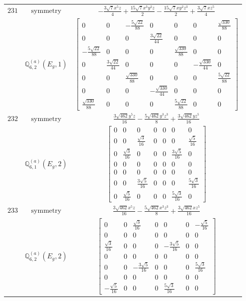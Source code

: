 \documentclass[fleqn,8pt,landscape]{jsarticle}
\begin{document}
\begin{longtable}{ccc}
$ 231 $ & $ \text{symmetry} $ & $ - \frac{3 \sqrt{7} x^{5} z}{4} + \frac{15 \sqrt{7} x^{3} y^{2} z}{2} - \frac{15 \sqrt{7} x y^{2} z^{3}}{2} + \frac{3 \sqrt{7} x z^{5}}{4} $ \\
$  $ & $ \mathbb{Q}_{6,2}^{(a)}(E_{g},1) $ & $ \begin{bmatrix} 0 & 0 & - \frac{5 \sqrt{22}}{88} & 0 & 0 & 0 & \frac{\sqrt{330}}{88} \\ 0 & 0 & 0 & \frac{3 \sqrt{22}}{44} & 0 & 0 & 0 \\ - \frac{5 \sqrt{22}}{88} & 0 & 0 & 0 & \frac{\sqrt{330}}{88} & 0 & 0 \\ 0 & \frac{3 \sqrt{22}}{44} & 0 & 0 & 0 & - \frac{\sqrt{330}}{44} & 0 \\ 0 & 0 & \frac{\sqrt{330}}{88} & 0 & 0 & 0 & \frac{5 \sqrt{22}}{88} \\ 0 & 0 & 0 & - \frac{\sqrt{330}}{44} & 0 & 0 & 0 \\ \frac{\sqrt{330}}{88} & 0 & 0 & 0 & \frac{5 \sqrt{22}}{88} & 0 & 0 \end{bmatrix} $ \\ \hline
$ 232 $ & $ \text{symmetry} $ & $ \frac{3 \sqrt{462} y^{5} z}{16} - \frac{5 \sqrt{462} y^{3} z^{3}}{8} + \frac{3 \sqrt{462} y z^{5}}{16} $ \\
$  $ & $ \mathbb{Q}_{6,1}^{(a)}(E_{g},2) $ & $ \begin{bmatrix} 0 & 0 & 0 & 0 & 0 & 0 & 0 \\ 0 & 0 & \frac{\sqrt{3}}{16} & 0 & 0 & 0 & \frac{\sqrt{5}}{16} \\ 0 & \frac{\sqrt{3}}{16} & 0 & 0 & 0 & \frac{3 \sqrt{5}}{16} & 0 \\ 0 & 0 & 0 & 0 & 0 & 0 & 0 \\ 0 & 0 & 0 & 0 & 0 & 0 & 0 \\ 0 & 0 & \frac{3 \sqrt{5}}{16} & 0 & 0 & 0 & \frac{5 \sqrt{3}}{16} \\ 0 & \frac{\sqrt{5}}{16} & 0 & 0 & 0 & \frac{5 \sqrt{3}}{16} & 0 \end{bmatrix} $ \\ \hline
$ 233 $ & $ \text{symmetry} $ & $ \frac{3 \sqrt{462} x^{5} z}{16} - \frac{5 \sqrt{462} x^{3} z^{3}}{8} + \frac{3 \sqrt{462} x z^{5}}{16} $ \\
$  $ & $ \mathbb{Q}_{6,2}^{(a)}(E_{g},2) $ & $ \begin{bmatrix} 0 & 0 & \frac{\sqrt{3}}{16} & 0 & 0 & 0 & - \frac{\sqrt{5}}{16} \\ 0 & 0 & 0 & 0 & 0 & 0 & 0 \\ \frac{\sqrt{3}}{16} & 0 & 0 & 0 & - \frac{3 \sqrt{5}}{16} & 0 & 0 \\ 0 & 0 & 0 & 0 & 0 & 0 & 0 \\ 0 & 0 & - \frac{3 \sqrt{5}}{16} & 0 & 0 & 0 & \frac{5 \sqrt{3}}{16} \\ 0 & 0 & 0 & 0 & 0 & 0 & 0 \\ - \frac{\sqrt{5}}{16} & 0 & 0 & 0 & \frac{5 \sqrt{3}}{16} & 0 & 0 \end{bmatrix} $ \\ \hline

\end{longtable}
\end{document}
